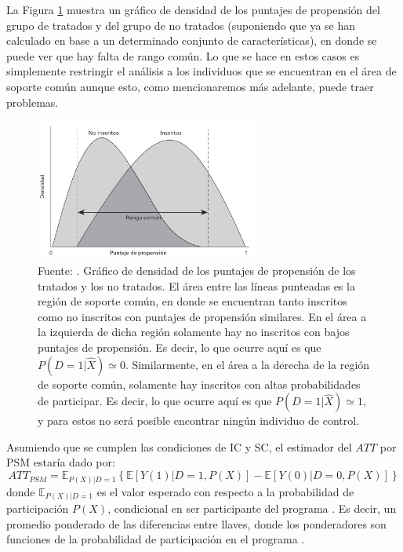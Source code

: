 \documentclass[../../main.tex]{subfiles}
\begin{document}
La Figura \ref{fig:common-support} muestra un gráfico de densidad de los puntajes de
propensión del grupo de tratados y del grupo de no tratados (suponiendo que ya se han
calculado en base a un determinado conjunto de características), en donde se puede ver que
hay falta de rango común. Lo que se hace en estos casos es simplemente restringir el
análisis a los individuos que se encuentran en el área de soporte común aunque esto, como
mencionaremos más adelante, puede traer problemas.

\begin{figure}[ht]
    \centering
    \includegraphics[width=0.65\textwidth]{figs/soporte-comun.png}
    \caption{Fuente: \cite{gertler-2016}. Gráfico de densidad de los puntajes de
    propensión de los tratados y los no tratados. El área entre las líneas punteadas es la
    región de soporte común, en donde se encuentran tanto inscritos como no inscritos con
    puntajes de propensión similares. En el área a la izquierda de dicha región solamente
    hay no inscritos con bajos puntajes de propensión. Es decir, lo que ocurre aquí es que
    \(P(D=1|\hat{X}) \simeq 0\). Similarmente, en el área a la derecha de la región de
    soporte común, solamente hay inscritos con altas probabilidades de participar. Es
    decir, lo que ocurre aquí es que \(P(D=1|\hat{X}) \simeq 1\), y para estos no será
    posible encontrar ningún individuo de control.}
    \label{fig:common-support}
\end{figure}

Asumiendo que se cumplen las condiciones de IC y SC, el estimador del \(ATT\) por PSM
estaría dado por:
\begin{equation}
ATT_{PSM} = \mathbb{E}_{P(X)|D=1}
    \left\{
        \mathbb{E}\left[Y(1)|D=1, P(X)\right] - \mathbb{E}\left[Y(0)|D=0, P(X)\right]
    \right\}
    \label{ATT-PSM}
\end{equation}
donde \(\mathbb{E}_{P(X)|D=1}\) es el valor esperado con respecto a la probabilidad de
participación \(P(X)\), condicional en ser participante del programa \cite{bernal}. Es
decir, un promedio ponderado de las diferencias entre llaves, donde los ponderadores
son funciones de la probabilidad de participación en el programa \cite{bernal}.
\end{document}
